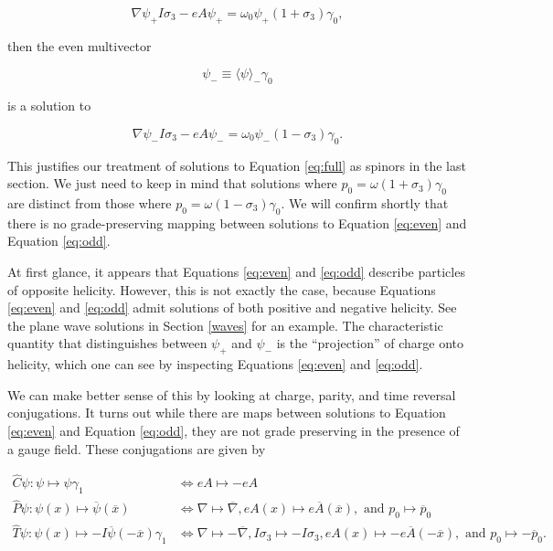 \documentclass{article}
\begin{document}
  \begin{equation}
    \nabla \psi_+ I \sigma_3 - e A \psi_+ = \omega_0 \psi_+ (1 + \sigma_3) \gamma_0,\label{eq:even}
  \end{equation}

  then the even multivector 

  \begin{equation}
    \psi_- \equiv \langle \psi \rangle_- \gamma_0\label{eq:0decomposition}
  \end{equation} 

  is a solution to

  \begin{equation}
    \nabla \psi_- I \sigma_3 - e A \psi_- = \omega_0 \psi_- (1 - \sigma_3) \gamma_0.\label{eq:odd}
  \end{equation}

  This justifies our treatment of solutions to Equation \ref{eq:full} as spinors in the last section. We just need to keep in mind that solutions where $p_0 = \omega(1 + \sigma_3) \gamma_0$ are distinct from those where $p_0 = \omega(1 - \sigma_3) \gamma_0$. We will confirm shortly that there is no grade-preserving mapping between solutions to Equation \ref{eq:even} and Equation \ref{eq:odd}.

  At first glance, it appears that Equations \ref{eq:even} and \ref{eq:odd} describe particles of opposite helicity. However, this is not exactly the case, because Equations \ref{eq:even} and \ref{eq:odd} admit solutions of both positive and negative helicity. See the plane wave solutions in Section \ref{waves} for an example. The characteristic quantity that distinguishes between $\psi_+$ and $\psi_-$ is the ``projection'' of charge onto helicity, which one can see by inspecting Equations \ref{eq:even} and \ref{eq:odd}.

  We can make better sense of this by looking at charge, parity, and time reversal conjugations. It turns out while there are maps between solutions to Equation \ref{eq:even} and Equation \ref{eq:odd}, they are not grade preserving in the presence of a gauge field. These conjugations are given by

  \begin{align}
    \hat C \psi : \psi \mapsto \psi \gamma_1 &\iff eA \mapsto - eA \label{eq:charge}\\
    \hat P \psi : \psi(x) \mapsto \overline \psi(\overline x) &\iff \nabla \mapsto \overline \nabla, eA(x) \mapsto e\overline A(\overline x), \text{ and } p_0 \mapsto \overline p_0 \label{eq:parity}\\
    \hat T \psi : \psi(x) \mapsto -I \overline \psi(-\overline x) \gamma_1 &\iff \nabla \mapsto -\overline\nabla, I\sigma_3 \mapsto - I\sigma_3, eA(x) \mapsto -e\overline A(-\overline x), \text{ and } p_0 \mapsto - \overline p_0.\label{eq:time}
  \end{align}
\end{document}
